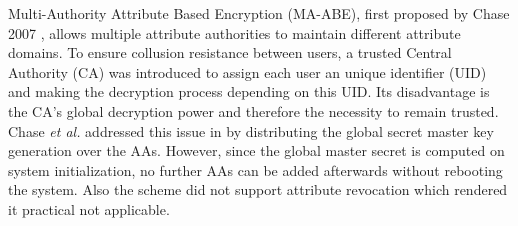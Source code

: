 \documentclass[twocolumn]{article}
\begin{document}
Multi-Authority Attribute Based Encryption (MA-ABE), first proposed by Chase 2007 \cite{chase2007multi}, allows multiple attribute authorities to maintain different attribute domains. To ensure collusion resistance between users, a trusted  Central Authority (CA) was introduced to assign each user an unique identifier (UID) and making the decryption process depending on this UID. Its disadvantage is the CA's global decryption power and therefore the necessity to remain trusted. 
Chase \textit{et al.} addressed this issue in \cite{chase2009improving} by distributing the global secret  master key generation over the AAs. However, since the global master secret is computed on system initialization, no further AAs can be added afterwards without rebooting the system. Also the scheme did not support attribute revocation which rendered it practical not applicable.

\end{document}
